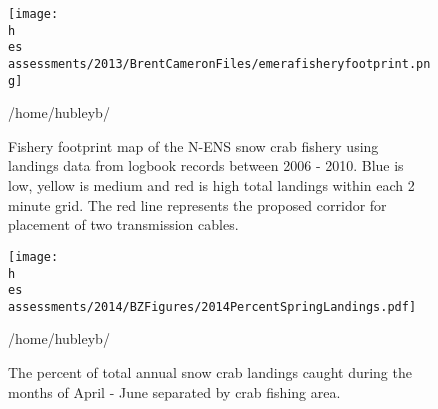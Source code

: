 \documentclass[11pt]{article}
\newcommand{\D}{.}
\newcommand{\h}{/home/hubleyb/}
\newcommand{\es}{bio.data/bio.snowcrab/}
\begin{document}


%


\begin{figure}
\centering
\texttt{[image: \\h \\es assessments/2013/BrentCameronFiles/emerafisheryfootprint.png]}
\caption{Fishery footprint map of the N-ENS snow crab fishery using landings data from logbook records between 2006 - 2010. Blue is low, yellow is medium and red is high total landings within each 2 minute grid. The red line represents the proposed corridor for placement of two transmission cables.  }
\h \end{figure}
\clearpage
\begin{figure}
\centering
\texttt{[image: \\h \\es assessments/2014/BZFigures/2014PercentSpringLandings.pdf]}
\caption{The percent of total annual snow crab landings caught during the months of April - June separated by crab fishing area.}
\h \end{figure}
\clearpage
\end{document}

